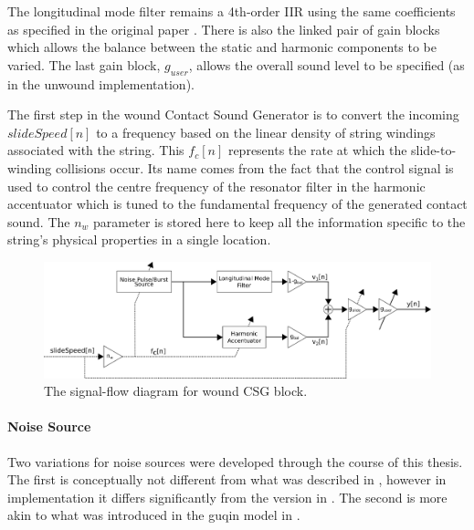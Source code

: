 \documentclass[../main.tex]{subfiles}
\begin{document}
The longitudinal mode filter remains a 4th-order IIR using the same coefficients as specified in the original paper . There is also the linked pair of gain blocks which allows the balance between the static and harmonic components to be varied. The last gain block, $g_{user}$, allows the overall sound level to be specified (as in the unwound implementation).

The first step in the wound Contact Sound Generator is to convert the incoming $slideSpeed[n]$ to a frequency based on the linear density of string windings associated with the string. This $f_c[n]$ represents the rate at which the slide-to-winding collisions occur. Its name comes from the fact that the control signal is used to control the centre frequency of the resonator filter in the harmonic accentuator which is tuned to the fundamental frequency of the generated contact sound. The $n_w$ parameter is stored here to keep all the information specific to the string's physical properties in a single location.

\begin{figure}[h]
    \centering
    \includegraphics[scale=.5]{./images/diagrams/CSG_wound.png}
    \caption{The signal-flow diagram for wound CSG block.}
    \label{fig:CSG_wound}
\end{figure}

\paragraph{Noise Source}
Two variations for noise sources were developed through the course of this thesis. The first is conceptually not different from what was described in , however in implementation it differs significantly from the version in . The second is more akin to what was introduced in  the guqin model in .
\end{document}
